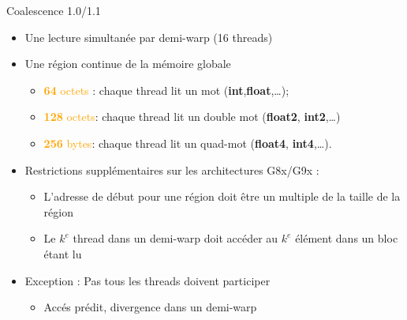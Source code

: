 \documentclass{beamer}
\begin{document}
  
\begin{frame}[containsverbatim]{Coalescence 1.0/1.1}

  \begin{itemize}
  \item Une lecture simultanée par demi-warp (16 threads)
  \item Une région continue de la mémoire globale
    \begin{itemize}
    \item \textcolor{orange}{\textbf{64} octets} : chaque thread lit un mot  (\textbf{int},\textbf{float},\ldots);
    \item \textcolor{orange}{\textbf{128} octets}: chaque thread lit un double mot (\textbf{float2}, \textbf{int2},\ldots)
    \item \textcolor{orange}{\textbf{256} bytes}: chaque thread lit un quad-mot (\textbf{float4}, \textbf{int4},\ldots).
    \end{itemize}
  \item Restrictions supplémentaires sur les architectures  G8x/G9x :
    \begin{itemize}
    \item L'adresse de début pour une région doit être un multiple de la taille de la région
    \item Le $k^{e}$ thread dans un demi-warp doit accéder au 
      $k^{e}$ élément dans un bloc étant lu
    \end{itemize}
  \item Exception : Pas tous les threads doivent participer
    \begin{itemize}
    \item Accés prédit, divergence dans un demi-warp
    \end{itemize}
  \end{itemize}
\end{frame}
\end{document}
